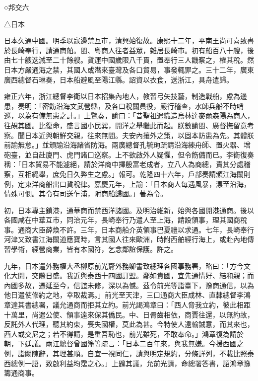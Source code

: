 
\begin{pinyinscope}
○邦交六

△日本

日本久通中國。明季以寇邊禁互市，清興始復故。康熙十二年，平南王尚可喜致書於長崎奉行，請通商舶。閩、粵商人往者益眾，雜居長崎市。初有船百八十艘，後由七十艘迭減至二十餘艘。貨運中國歲限八千貫，置奉行三人譏察之，榷其稅。然日本方嚴通海之禁，其國人或潛來臺灣及各口貿易，事發輒罪之。三十二年，廣東廣西總督石琳奏，日本船避風至陽江縣。詔資以衣食，送浙江，具舟遣歸。

雍正六年，浙江總督李衛以日本招集內地人，教習弓矢技藝，制造戰船，慮為邊患，奏明：「密飭沿海文武營縣，及各口稅關員役，嚴行稽查，水師兵船不時哨巡，以為有備無患之計。」上覽奏，諭曰：「昔聖祖遣織造烏林達麥爾森陽為商人，往覘其國。比復命，盛言國小民巽，開洋之舉繼此而起。朕數諭閩、廣督撫留意考察。聞日本近與朝鮮交親，往來無間。夫安內攘外之策，以固本防患為先。其體朕前諭無怠。」並頒諭沿海諸省防海。兩廣總督孔毓珣疏請沿海練舟師、置火器、增砲臺，並自赴廈門、虎門諸口巡察。上不欲啟外人疑懼，但令飭備而已。李衛復奏稱：「日本貿易不能遽絕，請於洋商中擇殷富老成者，立八人為商總，責其分處稽察，互相繩舉，庶免日久弊生之慮。」報可。乾隆四十六年，戶部奏請頒江海關則例，定東洋商船出口貨稅律。嘉慶元年，上諭：「日本商人每遇風暴，漂至沿海，情殊可憫。其令有司送乍浦，附商船歸國。」著為令。

初，日本專主鎖港，通華商而禁西洋諸國。及明治維新，始與各國開港通商。後以各國咸在中華互市，同治元年，長崎奉行乃遣人至上海，請設領事，理其國商稅事。通商大臣薛煥不許。三年，日本商船介英領事巴夏禮以求通。七年，長崎奉行河津又致書江海關道應寶時，言其國人往來歐洲，時附西舶經行海上，或赴內地傳習學術，經營商業，皆有本國符，乞念鄰誼保護。許之。

九年，日本遣外務權大丞柳原前光齎外務卿書致總理各國事務署，略曰：「方今文化大開，交際日盛。我近與泰西十四國訂盟。鄰如貴國，宜先通情好、結和親；而內國多故，遷延至今，信誼未修，深以為憾。茲令前光等詣臺下，豫商通信，以為他日遣使修約之地，幸取裁焉。」前光至天津，三口通商大臣成林、直隸總督李鴻章達其書總署，議允通商而拒其立約。前光謁鴻章曰：「西人脅我立約，彼此相距十萬里，尚遣公使、領事遠來保其僑民。中、日脣齒相依，商賈往還，以無約故，反託外人代理，聽其約束，喪失國權，莫此為甚。今特使人遠輸誠意，而其來也，西人或交尼之；若不得請，是重吾恥也，前光雖死，不敢奉命。」鴻章復為請於朝，下廷議。兩江總督曾國籓等疏言：「日本二百年來，與我無嫌。今援西國之例，詣闕陳辭，其理甚順。自宜一視同仁，請與明定規約，分條詳列，不載比照泰西總例一語，致啟利益均霑之心。」上韙其議，允前光請，命總署答書，詔鴻章豫籌通商事。


\end{pinyinscope}
